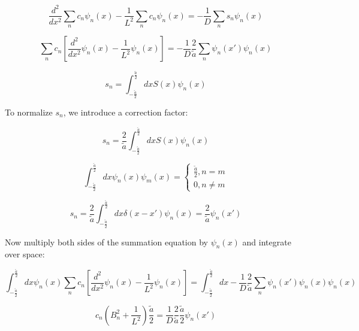 \documentclass[12pt]{article}
\begin{document}
\begin{equation*}
\frac{d^2}{dx^2}\sum_n c_n \psi_n(x) - \frac{1}{L^2}\sum_n c_n \psi_n(x)=-\frac{1}{D}\sum_n s_n \psi_n(x)
\end{equation*}

\begin{equation*}
\sum_n c_n\left[\frac{d^2}{dx^2}\psi_n(x) - \frac{1}{L^2}\psi_n(x)\right] =
-\frac{1}{D}\frac{2}{\tilde{a}}\sum_n \psi_n(x') \psi_n(x)
\end{equation*}

\begin{equation*}
s_n = \int_{-\tfrac{\tilde{a}}{2}}^{\tfrac{\tilde{a}}{2}}dxS(x)\psi_n(x)
\end{equation*}

To normalize $s_n$, we introduce a correction factor:

\begin{equation*}
s_n = \frac{2}{\tilde{a}}\int_{-\tfrac{\tilde{a}}{2}}^{\tfrac{\tilde{a}}{2}}dxS(x)\psi_n(x)
\end{equation*}

\begin{equation*}
\int_{-\tfrac{\tilde{a}}{2}}^{\tfrac{\tilde{a}}{2}}dx\psi_n(x)\psi_m(x) =\begin{cases}
	\tfrac{\tilde{a}}{2}, n = m \\
	0, n \neq m
	\end{cases}
\end{equation*}

\begin{equation*}
s_n = \frac{2}{\tilde{a}}\int_{-\tfrac{\tilde{a}}{2}}^{\tfrac{\tilde{a}}{2}}dx\delta(x-x')\psi_n(x)
= \frac{2}{\tilde{a}}\psi_n(x')
\end{equation*}

Now multiply both sides of the summation equation by $\psi_n(x)$ and integrate over space:

\begin{equation*}
\int_{-\tfrac{\tilde{a}}{2}}^{\tfrac{\tilde{a}}{2}}dx\psi_n(x)
\sum_n c_n\left[\frac{d^2}{dx^2}\psi_n(x) - \frac{1}{L^2}\psi_n(x)\right] =
\int_{-\tfrac{\tilde{a}}{2}}^{\tfrac{\tilde{a}}{2}}dx
-\frac{1}{D}\frac{2}{\tilde{a}}\sum_n \psi_n(x') \psi_n(x)\psi_n(x)
\end{equation*}

\begin{equation*}
c_n\left(B_n^2 + \frac{1}{L^2}\right)\frac{\tilde{a}}{2} = 
\frac{1}{D}\frac{2}{\tilde{a}}\frac{\tilde{a}}{2}\psi_n(x')
\end{equation*}
\end{document}
